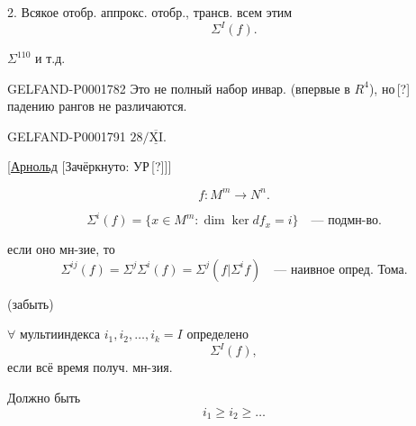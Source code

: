 2. Всякое отобр. аппрокс. отобр., трансв. всем этим
\begin{equation*}\Sigma^I(f).\end{equation*}

 $\Sigma^{110}$ и т.д.

\begin{GelfandAdjacentEvidence}{GELFAND-P000178}{2}
Это не полный набор инвар. (впервые в $R^4$), но\,[?] падению рангов не различаются.
\end{GelfandAdjacentEvidence}



\begin{GelfandAdjacentEvidence}{GELFAND-P000179}{1}
\underline{$28/\underline{\overline{\mathrm{XI}}}$}.  

[\underline{Арнольд} [Зачёркнуто: УР\,[?]]]
\end{GelfandAdjacentEvidence}

\begin{equation*}f:M^m\longrightarrow N^n.\end{equation*}

\begin{equation*}\Sigma^i(f)=\{x\in M^m:\dim\ker df_x=i\}\quad\text{— подмн-во}.\end{equation*}

если оно мн-зие, то
\begin{equation*}\Sigma^{ij}(f)=\Sigma^j\Sigma^i(f)=\Sigma^j(f|\Sigma^i f)\quad\text{— наивное опред. Тома}.\end{equation*}

(забыть)

$\forall$ мультииндекса $i_1,i_2,\ldots,i_k=I$ определено
\begin{equation*}\Sigma^I(f),\end{equation*}
если всё время получ. мн-зия.

Должно быть
\begin{equation*}i_1\ge i_2\ge\ldots\end{equation*}

